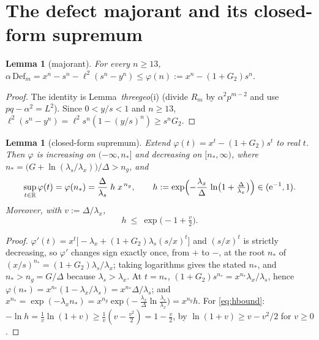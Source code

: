 \documentclass[11pt]{amsart}
\newtheorem{lemma}[theorem]{Lemma}
\newcommand{\eu}{\mathrm{e}}
\begin{document}
\section{The defect majorant and its closed-form supremum}\label{sec:majorant}

\begin{lemma}[majorant]\label{lem:majorant}
For every $n\ge13$,
\(
 \alpha\,\mathrm{Def}_m
 = x^n-s^n-\ell^2(s^n-y^n)
 \le \varphi(n):=x^n-(1+G_2)s^n .
\)
\end{lemma}

\begin{proof}
The identity is Lemma~\emph{threegeo}(i) (divide $R_m$ by $\alpha^2p^{m-2}$
and use $pq-\alpha^2=L^2$).  Since $0<y/s<1$ and $n\ge13$,
$\ell^2(s^n-y^n)=\ell^2 s^n(1-(y/s)^n)\ge s^nG_2$.
\end{proof}

\begin{lemma}[closed-form supremum]\label{lem:sup}
Extend $\varphi(t)=x^t-(1+G_2)s^t$ to real $t$.  Then $\varphi$ is increasing
on $(-\infty,n_*]$ and decreasing on $[n_*,\infty)$, where
$n_*=\bigl(G+\ln(\lambda_s/\lambda_x)\bigr)/\Delta>n_g$, and
\begin{equation}\label{eq:phistar}
 \sup_{t\in\mathbb R}\varphi(t)=\varphi(n_*)
 =\frac{\Delta}{\lambda_s}\;h\;x^{\,n_g},
 \qquad
 h:=\exp\Bigl(-\frac{\lambda_x}{\Delta}\,
 \ln\bigl(1+\tfrac\Delta{\lambda_x}\bigr)\Bigr)\in(\eu^{-1},1).
\end{equation}
Moreover, with $v:=\Delta/\lambda_x$,
\begin{equation}\label{eq:hbound}
 h\ \le\ \exp\bigl(-1+\tfrac v2\bigr).
\end{equation}
\end{lemma}

\begin{proof}
$\varphi'(t)=x^t\bigl[-\lambda_x+(1+G_2)\lambda_s(s/x)^t\bigr]$ and
$(s/x)^t$ is strictly decreasing, so $\varphi'$ changes sign exactly once,
from $+$ to $-$, at the root $n_*$ of
$(x/s)^{n_*}=(1+G_2)\lambda_s/\lambda_x$; taking logarithms gives the stated
$n_*$, and $n_*>n_g=G/\Delta$ because $\lambda_s>\lambda_x$.  At $t=n_*$,
$(1+G_2)s^{n_*}=x^{n_*}\lambda_x/\lambda_s$, hence
$\varphi(n_*)=x^{n_*}(1-\lambda_x/\lambda_s)=x^{n_*}\Delta/\lambda_s$; and
$x^{n_*}=\exp(-\lambda_xn_*)
 =x^{n_g}\exp\bigl(-\tfrac{\lambda_x}\Delta\ln\tfrac{\lambda_s}{\lambda_x}\bigr)
 =x^{n_g}h$.
For \eqref{eq:hbound}: $-\ln h=\tfrac1v\ln(1+v)\ge\tfrac1v(v-\tfrac{v^2}2)
=1-\tfrac v2$, by $\ln(1+v)\ge v-v^2/2$ for $v\ge0$.
\end{proof}
\end{document}
